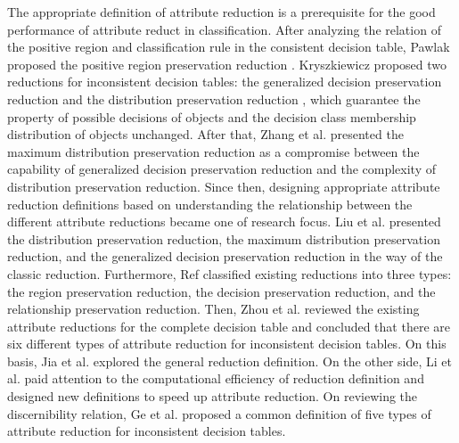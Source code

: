 \documentclass[review]{elsarticle}
\begin{document}
	\par The appropriate definition of attribute reduction is a prerequisite for the good performance of attribute reduct in classification. After analyzing the relation of the positive region and classification rule in the consistent decision table, Pawlak proposed the positive region preservation reduction \cite{Pawlak1982}. Kryszkiewicz proposed two reductions for inconsistent decision tables: the generalized decision preservation reduction and the distribution preservation reduction \cite{kryszkiewicz2001comparative}, which guarantee the property of possible decisions of objects and the decision class membership distribution of objects unchanged. After that, Zhang et al. \cite{zhang2003knowledge} presented the maximum distribution preservation reduction as a compromise between the capability of generalized decision preservation reduction and the complexity of distribution preservation reduction. Since then, designing appropriate attribute reduction definitions based on understanding the relationship between the different attribute reductions became one of research focus. Liu et al. \cite{liu2006knowledge} presented the distribution preservation reduction, the maximum distribution preservation reduction, and the generalized decision preservation reduction in the way of the classic reduction. Furthermore, Ref \cite{miao2009relative} classified existing reductions into three types: the region preservation reduction, the decision preservation reduction, and the relationship preservation reduction. Then, Zhou et al. \cite{zhou2011analysis} reviewed the existing attribute reductions for the complete decision table and concluded that there are six different types of attribute reduction for inconsistent decision tables. On this basis, Jia et al. \cite{jia2016generalized} explored the general reduction definition. On the other side, Li et al. \cite{li2014quick} paid attention to the computational efficiency of reduction definition and designed new definitions to speed up attribute reduction. On reviewing the discernibility relation, Ge et al. \cite{ge2017quick} proposed a common definition of five types of attribute reduction for inconsistent decision tables.
	
\end{document}

